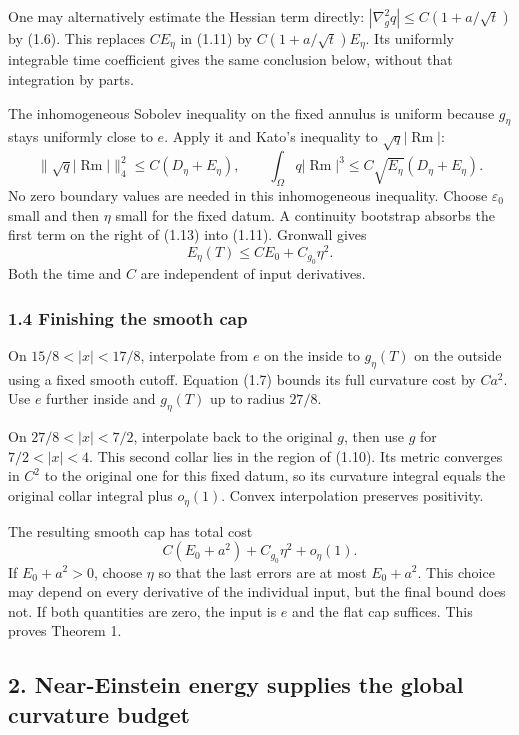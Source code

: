 \documentclass[
  10pt,
]{article}
\begin{document}
One may alternatively estimate the Hessian term directly:
\(|\nabla_g^2q|\le C(1+a/\sqrt t)\) by (1.6). This replaces \(CE_\eta\)
in (1.11) by \(C(1+a/\sqrt t)E_\eta\). Its uniformly integrable time
coefficient gives the same conclusion below, without that integration by
parts.

The inhomogeneous Sobolev inequality on the fixed annulus is uniform
because \(g_\eta\) stays uniformly close to \(e\). Apply it and Kato's
inequality to \(\sqrt q|\operatorname{Rm}|\): \[
 \|\sqrt q|\operatorname{Rm}|\|_4^2
        \le C(D_\eta+E_\eta),\qquad
 \int_\Omega q|\operatorname{Rm}|^3
        \le C\sqrt{E_\eta}(D_\eta+E_\eta).             \tag{1.13}
\] No zero boundary values are needed in this inhomogeneous inequality.
Choose \(\varepsilon_0\) small and then \(\eta\) small for the fixed
datum. A continuity bootstrap absorbs the first term on the right of
(1.13) into (1.11). Gronwall gives \[
                     E_\eta(T)\le CE_0+C_{g_0}\eta^2. \tag{1.14}
\] Both the time and \(C\) are independent of input derivatives.

\hypertarget{finishing-the-smooth-cap}{%
\subsubsection{1.4 Finishing the smooth
cap}\label{finishing-the-smooth-cap}}

On \(15/8<|x|<17/8\), interpolate from \(e\) on the inside to
\(g_\eta(T)\) on the outside using a fixed smooth cutoff. Equation (1.7)
bounds its full curvature cost by \(Ca^2\). Use \(e\) further inside and
\(g_\eta(T)\) up to radius \(27/8\).

On \(27/8<|x|<7/2\), interpolate back to the original \(g\), then use
\(g\) for \(7/2<|x|<4\). This second collar lies in the region of
(1.10). Its metric converges in \(C^2\) to the original one for this
fixed datum, so its curvature integral equals the original collar
integral plus \(o_\eta(1)\). Convex interpolation preserves positivity.

The resulting smooth cap has total cost \[
 C(E_0+a^2)+C_{g_0}\eta^2+o_\eta(1).
\] If \(E_0+a^2>0\), choose \(\eta\) so that the last errors are at most
\(E_0+a^2\). This choice may depend on every derivative of the
individual input, but the final bound does not. If both quantities are
zero, the input is \(e\) and the flat cap suffices. This proves Theorem
1.

\hypertarget{near-einstein-energy-supplies-the-global-curvature-budget}{%
\subsection{2. Near-Einstein energy supplies the global curvature
budget}\label{near-einstein-energy-supplies-the-global-curvature-budget}}
\end{document}

